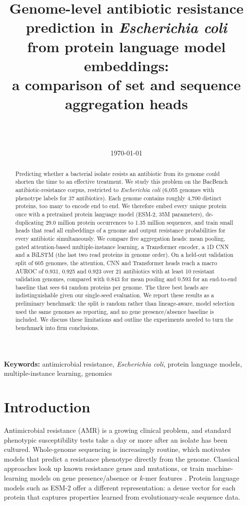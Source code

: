 \documentclass[11pt,a4paper]{article}
\title{Genome-level antibiotic resistance prediction in \textit{Escherichia coli}\\
from protein language model embeddings:\\
a comparison of set and sequence aggregation heads}
\author{
  \todo{Author name}\\
  \textit{\todo{Affiliation}}\\
  \texttt{\todo{email}}
}
\date{\today}
\begin{document}
\maketitle

\begin{abstract}
Predicting whether a bacterial isolate resists an antibiotic from its genome could shorten the time to an effective treatment.
We study this problem on the BacBench antibiotic-resistance corpus, restricted to \textit{Escherichia coli}
(6{,}055 genomes with phenotype labels for 37 antibiotics).
Each genome contains roughly 4{,}700 distinct proteins, too many to encode end to end.
We therefore embed every unique protein once with a pretrained protein language model (ESM-2, 35M parameters),
de-duplicating 29.0 million protein occurrences to 1.35 million sequences, and train small heads that read all embeddings of a genome
and output resistance probabilities for every antibiotic simultaneously.
We compare five aggregation heads: mean pooling, gated attention-based multiple-instance learning, a Transformer encoder, a 1D CNN and a BiLSTM
(the last two read proteins in genome order).
On a held-out validation split of 605 genomes, the attention, CNN and Transformer heads reach a macro AUROC of 0.931, 0.925 and 0.923 over 21 antibiotics
with at least 10 resistant validation genomes, compared with 0.843 for mean pooling and 0.593 for an end-to-end baseline that sees 64 random proteins per genome.
The three best heads are indistinguishable given our single-seed evaluation.
We report these results as a preliminary benchmark: the split is random rather than lineage-aware, model selection used the same genomes as reporting,
and no gene presence/absence baseline is included.
We discuss these limitations and outline the experiments needed to turn the benchmark into firm conclusions.
\end{abstract}

\noindent\textbf{Keywords:} antimicrobial resistance, \textit{Escherichia coli}, protein language models, multiple-instance learning, genomics

\section{Introduction}
Antimicrobial resistance (AMR) is a growing clinical problem, and standard phenotypic susceptibility tests take a day or more after an isolate has been cultured.
Whole-genome sequencing is increasingly routine, which motivates models that predict a resistance phenotype directly from the genome.
Classical approaches look up known resistance genes and mutations, or train machine-learning models on gene presence/absence or $k$-mer features
\citep{moradigaravand2018}.
Protein language models such as ESM-2 \citep{lin2023} offer a different representation: a dense vector for each protein that captures properties learned from evolutionary-scale sequence data.
\end{document}
